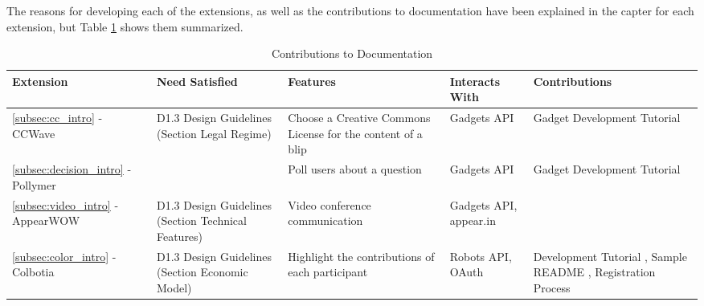 The reasons for developing each of the extensions, as well as the contributions to documentation have been explained in the capter for each extension, but Table \ref{fig:contributions} shows them summarized.
\begin{table}[h]
  \footnotesize
  \begin{center}
    \begin{tabular}{ | l | p{2.49cm} | p{2.1cm} | p{2.2cm} | p{2.3cm} |}
      \hline
      \textbf{Extension} & \textbf{Need Satisfied} & \textbf{Features} & \textbf{Interacts With} & \textbf{Contributions}\\
      \hline
      \ref{subsec:cc_intro} - CCWave & D1.3 Design Guidelines (Section Legal Regime) \cite{ref:p2pvalue} & Choose a Creative Commons License for the content of a blip & Gadgets API & Gadget Development Tutorial \cite{ref:gadget_development}\\
      \hline
      \ref{subsec:decision_intro} - Pollymer & & Poll users about a question & Gadgets API & Gadget Development Tutorial \cite{ref:gadget_development}\\
      \hline
      \ref{subsec:video_intro} - AppearWOW & D1.3 Design Guidelines (Section Technical Features) \cite{ref:p2pvalue} & Video conference communication & Gadgets API, appear.in & \\
      \hline
      \ref{subsec:color_intro} - Colbotia & D1.3 Design Guidelines (Section Economic Model) \cite{ref:p2pvalue} & Highlight the contributions of each participant & Robots API, OAuth & Development Tutorial \cite{ref:robot_development}, Sample README \cite{ref:readme_sample}, Registration Process \cite{ref:registration_process}\\
      \hline
    \end{tabular}
  \end{center}
  \caption{Contributions to Documentation}
  \label{fig:contributions}
\end{table}


